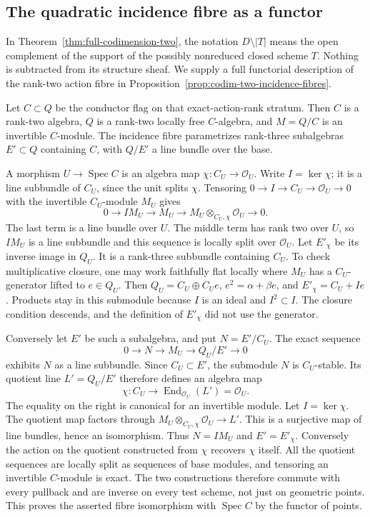 \subsection{The quadratic incidence fibre as a functor}
\label{sec:quadratic-fibre-functor}
In Theorem~\ref{thm:full-codimension-two}, the notation
$D\setminus|T|$ means the open complement of the support of the
possibly nonreduced closed scheme $T$. Nothing is subtracted from
its structure sheaf. We supply a full functorial description of the
rank-two action fibre in Proposition~\ref{prop:codim-two-incidence-fibres}.

Let $C\subset Q$ be the conductor flag on that exact-action-rank
stratum. Then $C$ is a rank-two algebra, $Q$ is a rank-two locally
free $C$-algebra, and $M=Q/C$ is an invertible $C$-module. The
incidence fibre parametrizes rank-three subalgebras $E'\subset Q$
containing $C$, with $Q/E'$ a line bundle over the base.

A morphism $U\to\operatorname{Spec}C$ is an algebra map
$\chi:C_U\to\mathcal O_U$. Write $I=\ker\chi$; it is a line
subbundle of $C_U$, since the unit splits $\chi$.
Tensoring $0\to I\to C_U\to\mathcal O_U\to0$ with the
invertible $C_U$-module $M_U$ gives
\[
 0\longrightarrow IM_U\longrightarrow M_U\longrightarrow
       M_U\otimes_{C_U,\chi}\mathcal O_U\longrightarrow0.
\]
The last term is a line bundle over $U$. The middle term has rank
two over $U$, so $IM_U$ is a line subbundle and this sequence is
locally split over $\mathcal O_U$. Let $E'_\chi$ be its inverse
image in $Q_U$. It is a rank-three subbundle containing $C_U$.
To check multiplicative closure, one may work faithfully flat locally
where $M_U$ has a $C_U$-generator lifted to $e\in Q_U$. Then
$Q_U=C_U\oplus C_Ue$, $e^2=\alpha+\beta e$, and
$E'_\chi=C_U+Ie$. Products stay in this submodule because $I$
is an ideal and $I^2\subset I$. The closure condition descends,
and the definition of $E'_\chi$ did not use the generator.

Conversely let $E'$ be such a subalgebra, and put $N=E'/C_U$.
The exact sequence
\[
 0\longrightarrow N\longrightarrow M_U\longrightarrow Q_U/E'
          \longrightarrow0
\]
exhibits $N$ as a line subbundle. Since $C_U\subset E'$, the
submodule $N$ is $C_U$-stable. Its quotient line $L'=Q_U/E'$
therefore defines an algebra map
\[
 \chi:C_U\longrightarrow\operatorname{End}_{\mathcal O_U}(L')
          =\mathcal O_U.
\]
The equality on the right is canonical for an invertible module.
Let $I=\ker\chi$. The quotient map factors through
$M_U\otimes_{C_U,\chi}\mathcal O_U\to L'$. This is a surjective
map of line bundles, hence an isomorphism. Thus $N=IM_U$ and
$E'=E'_\chi$. Conversely the action on the quotient constructed
from $\chi$ recovers $\chi$ itself. All the quotient sequences
are locally split as sequences of base modules, and tensoring an
invertible $C$-module is exact. The two constructions therefore
commute with every pullback and are inverse on every test scheme,
not just on geometric points. This proves the asserted fibre
isomorphism with $\operatorname{Spec}C$ by the functor of points.
